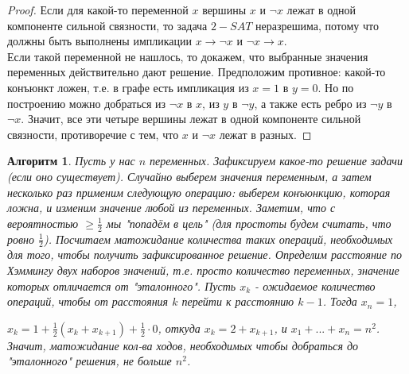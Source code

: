 \documentclass[a4paper]{article}
\theoremstyle{indented}
\newtheorem{alg}{Алгоритм}
\theoremstyle{definition}
\theoremstyle{remark}
\DeclareMathOperator{\ra}{\rightarrow}
\begin{document}
\begin{proof}
Если для какой-то переменной $x$ вершины $x$ и $\neg x$ лежат в одной компоненте сильной связности, то задача $2-SAT$ неразрешима, потому что должны быть выполнены импликации $x \ra \neg x$ и $\neg x \ra x$. 
\\
Если такой переменной не нашлось, то докажем, что выбранные значения переменных действительно дают решение. Предположим противное: какой-то конъюнкт ложен, т.е. в графе есть импликация из $x=1$ в $y=0$. Но по построению можно добраться из $\neg x$ в $x$, из $y$ в $\neg y$, а также есть ребро из $\neg y$ в $\neg x$. Значит, все эти четыре вершины лежат в одной компоненте сильной связности, противоречие с тем, что $x$ и $\neg x$ лежат в разных.
\end{proof}

\begin{alg}
Пусть у нас $n$ переменных. Зафиксируем какое-то решение задачи (если оно существует). Случайно выберем значения переменным, а затем несколько раз применим следующую операцию: выберем конъюнкцию, которая ложна, и изменим значение любой из переменных. Заметим, что с вероятностью $\geq \frac{1}{2}$ мы "попадём в цель" (для простоты будем считать, что ровно $\frac{1}{2}$). Посчитаем матожидание количества таких операций, необходимых для того, чтобы получить зафиксированное решение. Определим расстояние по Хэммингу двух наборов значений, т.е. просто количество переменных, значение которых отличается от "эталонного". Пусть $x_k$ - ожидаемое количество операций, чтобы от расстояния $k$ перейти к расстоянию $k-1$. Тогда $x_n=1$,
 
$x_k=1+\frac{1}{2}(x_k+x_{k+1})+\frac{1}{2} \cdot 0$, откуда $x_k=2+x_{k+1}$, и $x_1+...+x_n=n^2$. Значит, матожидание кол-ва ходов, необходимых чтобы добраться до "эталонного" решения, не больше $n^2$.
\end{alg}
\end{document}

